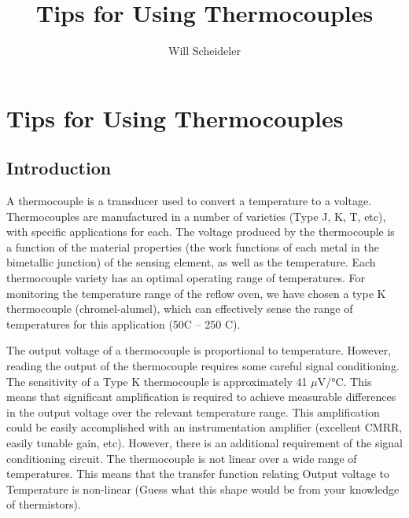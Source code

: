 \documentclass[10pt]{report}
\title{Tips for Using Thermocouples}
\author{Will Scheideler}
\begin{document}
\section*{Tips for Using Thermocouples}

\subsection*{Introduction}
A thermocouple is a transducer used to convert a temperature to a voltage. Thermocouples are manufactured in a number of varieties (Type J, K, T, etc), with specific applications for each. The voltage produced by the thermocouple is a function of the material properties (the work functions of each metal in the bimetallic junction) of the sensing element, as well as the temperature. Each thermocouple variety has an optimal operating range of temperatures. For monitoring the temperature range of the reflow oven, we have chosen a type K thermocouple (chromel-alumel), which can effectively sense the range of temperatures for this application (50C – 250 C).

\par
	The output voltage of a thermocouple is proportional to temperature. However, reading the output of the thermocouple requires some careful signal conditioning. The sensitivity of a Type K thermocouple is approximately 41 $\mu$V/°C. This means that significant amplification is required to achieve measurable differences in the output voltage over the relevant temperature range. This amplification could be easily accomplished with an instrumentation amplifier (excellent CMRR, easily tunable gain, etc). However, there is an additional requirement of the signal conditioning circuit. The thermocouple is not linear over a wide range of temperatures. This means that the transfer function relating Output voltage to Temperature is non-linear (Guess what this shape would be from your knowledge of thermistors). 
\end{document}
